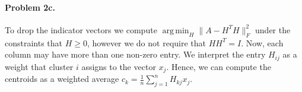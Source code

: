 \documentclass[12pt]{article}
\DeclareMathOperator*{\argmin}{arg\,min}
\begin{document}
\paragraph{Problem 2c.}
To drop the indicator vectors we compute $\argmin_H \|A - H^TH\|^2_F $ under the constraints that $H \geq 0$, however we do not require that $HH^T = I$. Now, each column may have more than one non-zero entry. We interpret the entry $H_{ij}$ as a weight that cluster $i$ assigns to the vector $x_j$. Hence, we can compute the centroids as a weighted average $c_k = \frac{1}{n}\sum_{j=1}^n H_{kj} x_j$.



\end{document}
